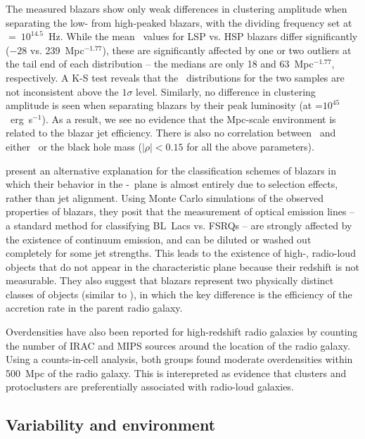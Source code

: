 \documentclass{emulateapj}
\begin{document}
The measured blazars show only weak differences in clustering amplitude when separating the low- from high-peaked blazars, with the dividing frequency set at \nupeak~$=~10^{14.5}$~Hz. While the mean \bgb~values for LSP vs. HSP blazars differ significantly ($-28$ vs. 239~Mpc$^{-1.77}$), these are significantly affected by one or two outliers at the tail end of each distribution -- the medians are only 18 and 63~Mpc$^{-1.77}$, respectively. A K-S test reveals that the \bgb~distributions for the two samples are not inconsistent above the $1\sigma$ level. Similarly, no difference in clustering amplitude is seen when separating blazars by their peak luminosity (at \lpeak=$10^{45}$~erg~s$^{-1}$). As a result, we see no evidence that the Mpc-scale environment is related to the blazar jet efficiency. There is also no correlation between \bgb~and either \lext~or the black hole mass ($|\rho|<0.15$ for all the above parameters). 

\citet{gio12} present an alternative explanation for the classification schemes of blazars in which their behavior in the \nupeak-\lpeak~plane is almost entirely due to selection effects, rather than jet alignment. Using Monte Carlo simulations of the observed properties of blazars, they posit that the measurement of optical emission lines -- a standard method for classifying BL~Lacs vs. FSRQs -- are strongly affected by the existence of continuum emission, and can be diluted or washed out completely for some jet strengths. This leads to the existence of high-\nupeak, radio-loud objects that do not appear in the characteristic plane because their redshift is not measurable. They also suggest that blazars represent two physically distinct classes of objects (similar to \citet{mey11}), in which the key difference is the efficiency of the accretion rate in the parent radio galaxy. 

Overdensities have also been reported for high-redshift radio galaxies by counting the number of IRAC \citep{gal12} and MIPS \citep{may12} sources around the location of the radio galaxy. Using a counts-in-cell analysis, both groups found moderate overdensities within 500~Mpc of the radio galaxy. This is interepreted as evidence that clusters and protoclusters are preferentially associated with radio-loud galaxies. 

\subsection{Variability and environment}
\end{document}

